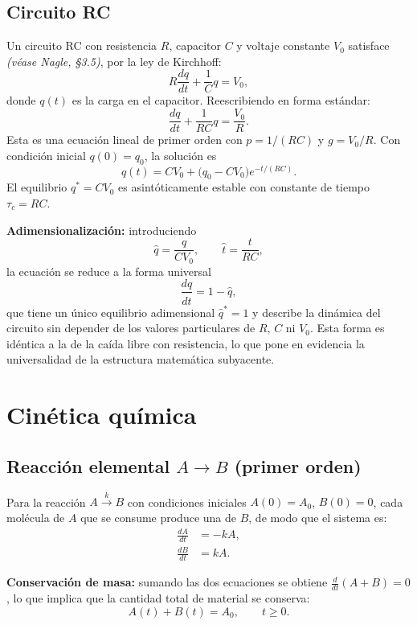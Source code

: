 \documentclass[11pt,letterpaper]{article}
\newcommand{\naglecite}[1]{\emph{(véase Nagle, #1)}}
\begin{document}
\subsection{Circuito RC}
\label{sec:circuito-rc}

Un circuito RC con resistencia $R$, capacitor $C$ y voltaje constante $V_0$
satisface \naglecite{§3.5}, por la ley de Kirchhoff:
\[
R\frac{dq}{dt}+\frac{1}{C}q=V_0,
\]
donde $q(t)$ es la carga en el capacitor. Reescribiendo en forma estándar:
\[
\frac{dq}{dt}+\frac{1}{RC}q=\frac{V_0}{R}.
\]
Esta es una ecuación lineal de primer orden con $p=1/(RC)$ y $g=V_0/R$.
Con condición inicial $q(0)=q_0$, la solución es
\[
\boxed{q(t)=CV_0+\bigl(q_0-CV_0\bigr)e^{-t/(RC)}.}
\]
El equilibrio $q^*=CV_0$ es asintóticamente estable con constante de tiempo $\tau_c=RC$.

\textbf{Adimensionalización:} introduciendo
\[
\hat{q}=\frac{q}{CV_0},\qquad \hat{t}=\frac{t}{RC},
\]
la ecuación se reduce a la forma universal
\[
\frac{d\hat{q}}{d\hat{t}}=1-\hat{q},
\]
que tiene un único equilibrio adimensional $\hat{q}^*=1$ y describe la
dinámica del circuito sin depender de los valores particulares de $R$, $C$ ni $V_0$.
Esta forma es idéntica a la de la caída libre con resistencia, lo que pone en
evidencia la universalidad de la estructura matemática subyacente.

\section{Cinética química}
\label{sec:cinetica}

\subsection{Reacción elemental \texorpdfstring{$A\to B$}{A to B} (primer orden)}

Para la reacción $A\xrightarrow{k}B$ con condiciones iniciales $A(0)=A_0$, $B(0)=0$,
cada molécula de $A$ que se consume produce una de $B$, de modo que el sistema es:
\[
\boxed{\begin{aligned}
\frac{dA}{dt}&=-kA,\\[4pt]
\frac{dB}{dt}&=kA.
\end{aligned}}
\]

\textbf{Conservación de masa:} sumando las dos ecuaciones se obtiene
$\frac{d}{dt}(A+B)=0$, lo que implica que la cantidad total de material se conserva:
\[
\boxed{A(t)+B(t)=A_0,\qquad t\geq 0.}
\]
\end{document}
